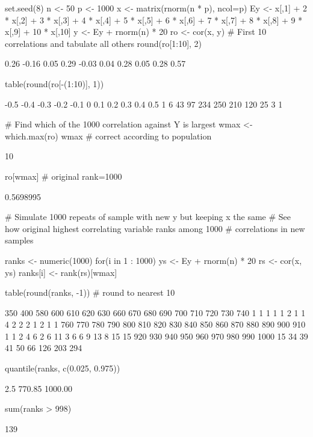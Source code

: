 \begin{Schunk}
\begin{Sinput}
set.seed(8)
n <- 50
p <- 1000
x <- matrix(rnorm(n * p), ncol=p)
Ey <- x[,1] + 2 * x[,2] + 3 * x[,3] + 4 * x[,4] + 5 * x[,5] + 6 * x[,6] +
      7 * x[,7] + 8 * x[,8] + 9 * x[,9] + 10 * x[,10]
y <- Ey + rnorm(n) * 20
ro <- cor(x, y)
# First 10 correlations and tabulate all others
round(ro[1:10], 2)
\end{Sinput}
\begin{Soutput}
 [1]  0.26 -0.16  0.05  0.29 -0.03  0.04  0.28  0.05  0.28  0.57
\end{Soutput}
\begin{Sinput}
table(round(ro[-(1:10)], 1))
\end{Sinput}
\begin{Soutput}

-0.5 -0.4 -0.3 -0.2 -0.1    0  0.1  0.2  0.3  0.4  0.5 
   1    6   43   97  234  250  210  120   25    3    1 
\end{Soutput}
\begin{Sinput}
# Find which of the 1000 correlation against Y is largest
wmax <- which.max(ro)
wmax     # correct according to population
\end{Sinput}
\begin{Soutput}
[1] 10
\end{Soutput}
\begin{Sinput}
ro[wmax]   # original rank=1000
\end{Sinput}
\begin{Soutput}
[1] 0.5698995
\end{Soutput}
\begin{Sinput}
# Simulate 1000 repeats of sample with new y but keeping x the same
# See how original highest correlating variable ranks among 1000
# correlations in new samples

ranks <- numeric(1000)
for(i in 1 : 1000) {
  ys <- Ey + rnorm(n) * 20
  rs <- cor(x, ys)
  ranks[i] <- rank(rs)[wmax]
}

table(round(ranks, -1))   # round to nearest 10
\end{Sinput}
\begin{Soutput}

 350  400  580  600  610  620  630  660  670  680  690  700  710  720  730  740 
   1    1    1    1    1    2    1    1    4    2    2    2    1    2    1    1 
 760  770  780  790  800  810  820  830  840  850  860  870  880  890  900  910 
   1    1    2    4    6    2    6   11    3    6    6    9   13    8   15   15 
 920  930  940  950  960  970  980  990 1000 
  15   34   39   41   50   66  126  203  294 
\end{Soutput}
\begin{Sinput}
quantile(ranks, c(0.025, 0.975))
\end{Sinput}
\begin{Soutput}
   2.5%
 770.85 1000.00 
\end{Soutput}
\begin{Sinput}
sum(ranks > 998)
\end{Sinput}
\begin{Soutput}
[1] 139
\end{Soutput}
\end{Schunk}

